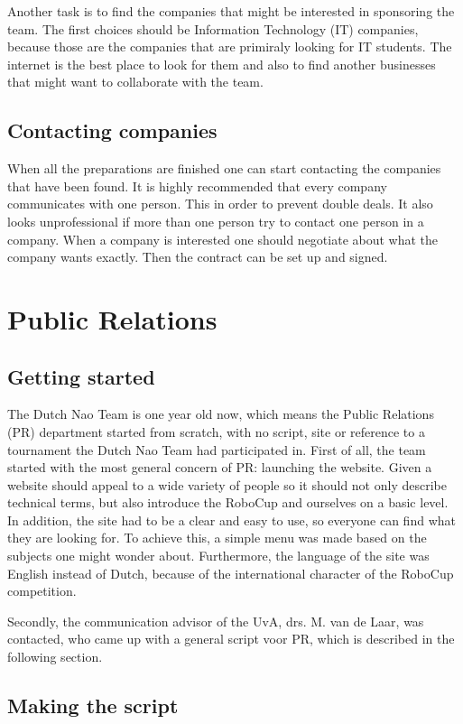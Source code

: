 \documentclass[11pt,a4paper,oneside]{article}
\begin{document}
Another task is to find the companies that might be interested in sponsoring the team. The first choices should be Information Technology (IT) companies, because those are the companies that are primiraly looking for IT students. The internet is the best place to look for them and also to find another businesses that might want to collaborate with the team.

\subsection{Contacting companies}
When all the preparations are finished one can start contacting the companies that have been found. It is highly recommended that every company communicates with one person. This in order to prevent double deals. It also looks unprofessional if more than one person try to contact one person in a company. When a company is interested one should negotiate about what the company wants exactly. Then the contract can be set up and signed.

\section{Public Relations}
\subsection{Getting started}
The Dutch Nao Team is one year old now, which means the Public Relations (PR) department started from scratch, with no script, site or reference to a tournament the Dutch Nao Team had participated in. First of all, the team started with the most general concern of PR: launching the website. Given a website should appeal to a wide variety of people so it should not only describe technical terms, but also introduce the RoboCup and ourselves on a basic level. In addition, the site had to be a clear and easy to use, so everyone can find what they are looking for. To achieve this, a simple menu was made based on the subjects one might wonder about. Furthermore, the language of the site was English instead of Dutch, because of the international character of the RoboCup competition.

Secondly, the communication advisor of the UvA, drs. M. van de Laar, was contacted, who came up with a general script voor PR, which is described in the following section.

\subsection{Making the script}
\end{document}
